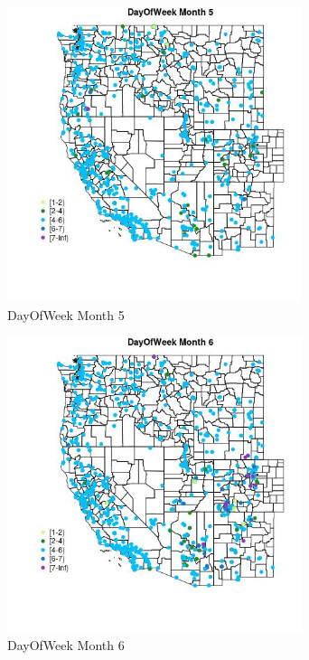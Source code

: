\begin{figure} 
\centering  
\includegraphics[width=0.77\textwidth]{Code_Outputs/Report_ML_input_PM25_Step4_part_e_de_duplicated_aveswNAs_MapObsMo5DayOfWeek.jpg} 
\caption{\label{fig:Report_ML_input_PM25_Step4_part_e_de_duplicated_aveswNAsMapObsMo5DayOfWeek}DayOfWeek Month 5} 
\end{figure} 
 

\begin{figure} 
\centering  
\includegraphics[width=0.77\textwidth]{Code_Outputs/Report_ML_input_PM25_Step4_part_e_de_duplicated_aveswNAs_MapObsMo6DayOfWeek.jpg} 
\caption{\label{fig:Report_ML_input_PM25_Step4_part_e_de_duplicated_aveswNAsMapObsMo6DayOfWeek}DayOfWeek Month 6} 
\end{figure} 
 

